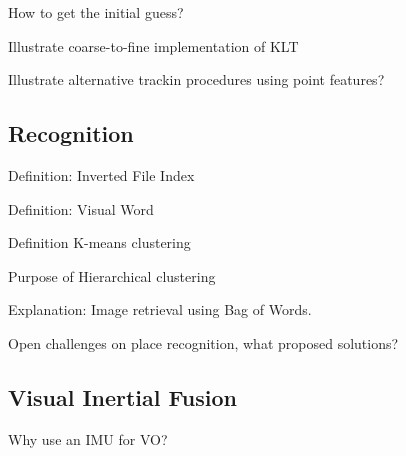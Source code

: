 \documentclass[10pt,a4paper]{scrartcl}
\begin{document}
\begin{multicols*}{2}
\begin{QandA}
{How to get the initial guess?}
\item
\end{QandA}

\begin{QandA}
{Illustrate coarse-to-fine implementation of KLT}
\item
\end{QandA}

\begin{QandA}
{Illustrate alternative trackin procedures using point features?}
\item
\end{QandA}

\subsection*{Recognition}

\begin{QandA}
{Definition: Inverted File Index}
\item
\end{QandA}

\begin{QandA}
{Definition: Visual Word}
\item
\end{QandA}

\begin{QandA}
{Definition K-means clustering}
\item
\end{QandA}

\begin{QandA}
{Purpose of Hierarchical clustering}
\item
\end{QandA}

\begin{QandA}
{Explanation: Image retrieval using Bag of Words.}
\item
\end{QandA}

\begin{QandA}
{Open challenges on place recognition, what proposed solutions?}
\item
\end{QandA}

\subsection*{Visual Inertial Fusion}

\begin{QandA}
{Why use an IMU for VO?}
\item
\end{QandA}


\end{multicols*}
\end{document}
